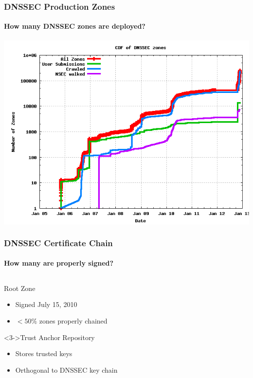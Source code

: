 \documentclass{beamer}
\begin{document}
\begin{frame}
  \frametitle{DNSSEC Production Zones}
  \framesubtitle{How many DNSSEC zones are deployed?}
  \includegraphics[width=.9\textwidth]{dnssec-growth}
\end{frame}

\begin{frame}
  \frametitle{DNSSEC Certificate Chain}
  \framesubtitle{How many are properly signed?}

  \begin{columns}[c]
    \begin{column}{4.8cm}

      \begin{block}{Root Zone}
        \begin{itemize}
        \item Signed July 15, 2010
        \item $< 50\%$ zones properly chained
        \end{itemize}
      \end{block}
  
      \begin{block}<3->{Trust Anchor Repository}
        \begin{itemize}
        \item Stores trusted keys
        \item Orthogonal to DNSSEC key chain
        \end{itemize}
      \end{block}

    \end{column}


  \end{columns}

\end{frame}
\end{document}
